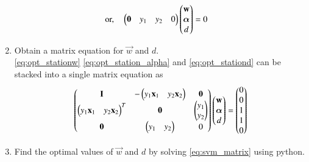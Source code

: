 \documentclass[journal,12pt,twocolumn]{IEEEtran}
\renewcommand\thesection{\arabic{section}}
\begin{document}
\begin{enumerate}[label=\thesection.\arabic*,ref=\thesection.\theenumi]
\begin{align}
\text{or,}\quad \begin{pmatrix}\mathbf{0}& y_1&y_2 & 0\end{pmatrix} \begin{pmatrix}\mathbf{w} 
\\\bm{\alpha} \\ d\end{pmatrix}&=0
\label{eq:opt_stationd}
\end{align}
%
\item Obtain a matrix equation  for $\vec{w}$ and $d$.
\\
\solution 
\eqref{eq:opt_stationw}
\eqref{eq:opt_station_alpha} and 
\eqref{eq:opt_stationd} can be stacked into a single matrix equation as
{\small
\begin{align}
\label{eq:svm_matrix}
\begin{pmatrix}\mathbf{I} & -\begin{pmatrix}y_1\mathbf{x}_1 & y_2\mathbf{x}_2\end{pmatrix} & \mathbf{0}
\\
\begin{pmatrix}y_1\mathbf{x}_1&y_2\mathbf{x}_2\end{pmatrix}^T & \mathbf{0} & \begin{pmatrix}y_1 \\ y_2\end{pmatrix}
\\
\mathbf{0}& \begin{pmatrix}y_1&y_2\end{pmatrix} & 0\end{pmatrix} 
\begin{pmatrix}\mathbf{w} 
\\\bm{\alpha} \\ d\end{pmatrix}=\begin{pmatrix}0 \\ 0 \\1\\1\\0\end{pmatrix} 
\end{align}
}
\item Find the optimal values of $\vec{w}$ and $d$ by solving \eqref{eq:svm_matrix} using python.

\end{enumerate}
\end{document}
